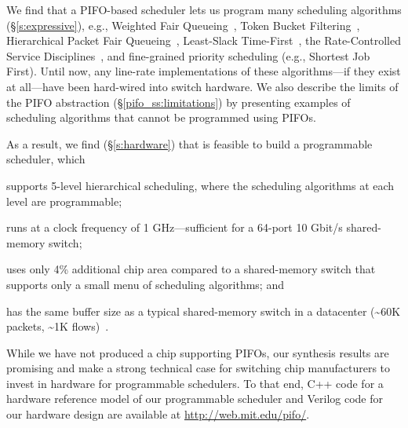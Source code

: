 We find that a PIFO-based scheduler lets us program many scheduling
algorithms (\S\ref{s:expressive}), e.g., Weighted Fair
Queueing~\cite{wfq}, Token Bucket Filtering~\cite{tbf}, Hierarchical
Packet Fair Queueing~\cite{hpfq}, Least-Slack Time-First~\cite{lstf}, the Rate-Controlled
Service Disciplines~\cite{rcsd}, and fine-grained priority scheduling
(e.g., Shortest Job First). Until now, any line-rate implementations
of these algorithms---if they exist at all---have been hard-wired into
switch hardware. We also describe the limits of the PIFO abstraction
(\S\ref{pifo_ss:limitations}) by presenting examples of scheduling
algorithms that cannot be programmed using PIFOs.


As a result, we find (\S\ref{s:hardware}) that is feasible to build a programmable scheduler, which
\begin{CompactItemize}
  \item supports 5-level hierarchical scheduling, where the scheduling
    algorithms at each level are programmable;
  \item runs at a clock frequency of 1 GHz---sufficient for a 64-port
    10 Gbit/s shared-memory switch;
  \item uses only 4\% additional chip area compared to a
    shared-memory switch that supports only a small menu of scheduling
    algorithms; and
  \item has the same buffer size as a typical shared-memory switch
    in a datacenter (\textasciitilde 60K packets, \textasciitilde 1K flows)~\cite{trident2}.
\end{CompactItemize}

While we have not produced a chip supporting PIFOs, our synthesis results
are promising and make a strong technical case for switching chip manufacturers to invest
in hardware for programmable schedulers. To that end, C++ code for a
hardware reference model of our programmable scheduler and Verilog
code for our hardware design are available at \url{http://web.mit.edu/pifo/}.
